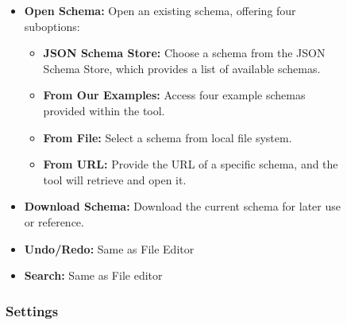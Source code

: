 \begin{figure}[h]
\begin{itemize}
    \item \textbf{Open Schema:} Open an existing schema, offering four suboptions:
    \begin{itemize}
        \item \textbf{JSON Schema Store:} Choose a schema from the JSON Schema Store, which provides a list of available schemas.

        \item \textbf{From Our Examples:} Access four example schemas provided within the tool.

        \item \textbf{From File:} Select a schema from local file system.

        \item \textbf{From URL:} Provide the URL of a specific schema, and the tool will retrieve and open it.

    \end{itemize}
\end{itemize}

\begin{itemize}
    \item \textbf{Download Schema:} Download the current schema for later use or reference.
\end{itemize}
\begin{itemize}
    \item \textbf{Undo/Redo:} Same as File Editor

\end{itemize}
\begin{itemize}
    \item \textbf{Search:} Same as File editor
\end{itemize}

\subsubsection{Settings}


\end{figure}
